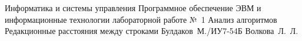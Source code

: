 \documentclass{bmstu}[a4paper]
\begin{document}
\makereporttitle
{Информатика и системы управления} %
{Программное обеспечение ЭВМ и информационные технологии} %
{лабораторной работе №~1} %
{Анализ алгоритмов} %
{Редакционные расстояния между строками} %
{} %
{Булдаков~М./ИУ7-54Б} %
{Волкова~Л.~Л.} %

\maketableofcontents









\makebibliography


\end{document}
